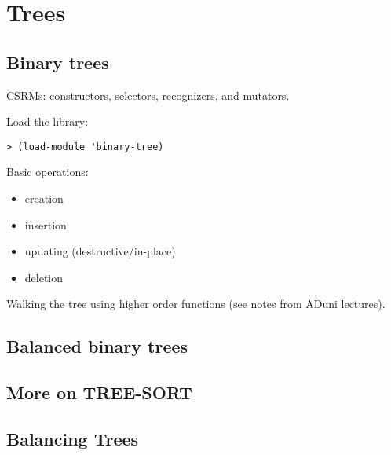 \documentclass[12pt,openright,draft]{book}
\begin{document}
\chapter{Trees}

\section{Binary trees}

CSRMs: constructors, selectors, recognizers, and mutators.

Load the library:

\begin{verbatim}
> (load-module 'binary-tree)
\end{verbatim}

Basic operations:

\begin{itemize}
\item creation
\item insertion
\item updating (destructive/in-place)
\item deletion
\end{itemize}

Walking the tree using higher order functions (see notes from ADuni lectures).

\section{Balanced binary trees}



\section{More on TREE-SORT}


\section{Balancing Trees}
\end{document}

